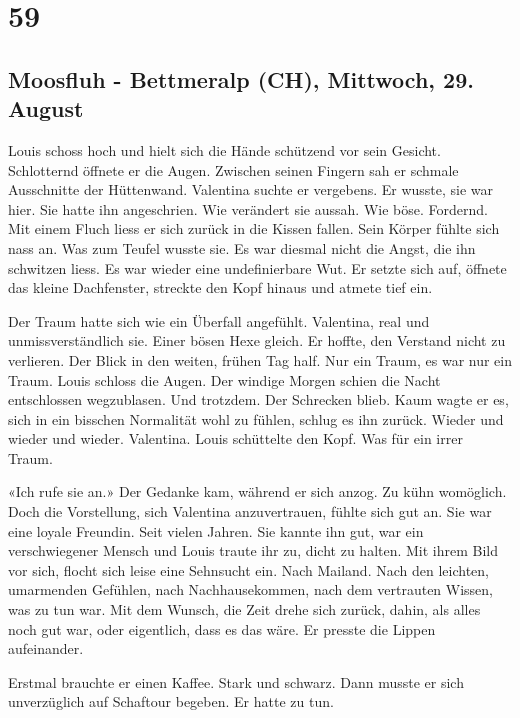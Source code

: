 \chapter{59}

\section{Moosfluh - Bettmeralp (CH), Mittwoch, 29. August}




\sectionbreak

Louis schoss hoch und hielt sich die Hände schützend
vor sein Gesicht. Schlotternd öffnete er die Augen. Zwischen seinen
Fingern sah er schmale Ausschnitte der Hüttenwand. Valentina suchte er
vergebens. Er wusste, sie war hier. Sie hatte ihn angeschrien. Wie
verändert sie aussah. Wie böse. Fordernd.
Mit einem Fluch liess er sich zurück in die Kissen fallen. Sein Körper fühlte sich nass an. Was zum Teufel wusste
sie. Es war diesmal nicht die Angst, die ihn schwitzen liess. Es war
wieder eine undefinierbare Wut. Er setzte sich auf, öffnete das kleine Dachfenster,  streckte den Kopf hinaus und
atmete tief ein.

Der Traum hatte sich wie ein Überfall angefühlt. Valentina, real und
unmissverständlich sie. Einer bösen Hexe gleich. Er hoffte, den Verstand
nicht zu verlieren. Der Blick in den weiten, frühen Tag half. Nur ein
Traum, es war nur ein Traum. Louis schloss die Augen. Der windige Morgen
schien die Nacht entschlossen wegzublasen.
Und trotzdem. Der Schrecken blieb. Kaum wagte er es, sich in ein
bisschen Normalität wohl zu fühlen, schlug es ihn zurück. Wieder und
wieder und wieder. Valentina. Louis schüttelte den Kopf. Was für ein
irrer Traum.

«Ich rufe sie an.» Der Gedanke kam, während er sich anzog. Zu kühn
womöglich. Doch die Vorstellung, sich Valentina anzuvertrauen, fühlte
sich gut an. Sie war eine loyale Freundin. Seit vielen Jahren. Sie
kannte ihn gut, war ein verschwiegener Mensch und Louis traute ihr zu,
dicht zu halten. Mit ihrem Bild vor sich, flocht sich leise eine
Sehnsucht ein. Nach Mailand. Nach den leichten, umarmenden Gefühlen,
nach Nachhausekommen, nach dem vertrauten Wissen, was zu tun war. Mit
dem Wunsch, die Zeit drehe sich zurück, dahin, als alles noch gut war,
oder eigentlich, dass es das wäre. Er presste die Lippen aufeinander.

Erstmal brauchte er einen Kaffee. Stark und schwarz. Dann musste er sich
unverzüglich auf Schaftour begeben. Er hatte zu tun.
